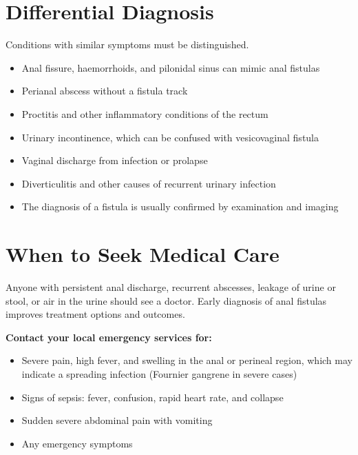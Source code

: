 \section*{Differential Diagnosis}
Conditions with similar symptoms must be distinguished.
\begin{itemize}
    \item Anal fissure, haemorrhoids, and pilonidal sinus can mimic anal fistulas
    \item Perianal abscess without a fistula track
    \item Proctitis and other inflammatory conditions of the rectum
    \item Urinary incontinence, which can be confused with vesicovaginal fistula
    \item Vaginal discharge from infection or prolapse
    \item Diverticulitis and other causes of recurrent urinary infection
    \item The diagnosis of a fistula is usually confirmed by examination and imaging
\end{itemize}

\section*{When to Seek Medical Care}
Anyone with persistent anal discharge, recurrent abscesses, leakage of urine or stool, or air in the urine should see a doctor. Early diagnosis of anal fistulas improves treatment options and outcomes.

\textbf{Contact your local emergency services for:}
\begin{itemize}
    \item Severe pain, high fever, and swelling in the anal or perineal region, which may indicate a spreading infection (Fournier gangrene in severe cases)
    \item Signs of sepsis: fever, confusion, rapid heart rate, and collapse
    \item Sudden severe abdominal pain with vomiting
    \item Any emergency symptoms
\end{itemize}

